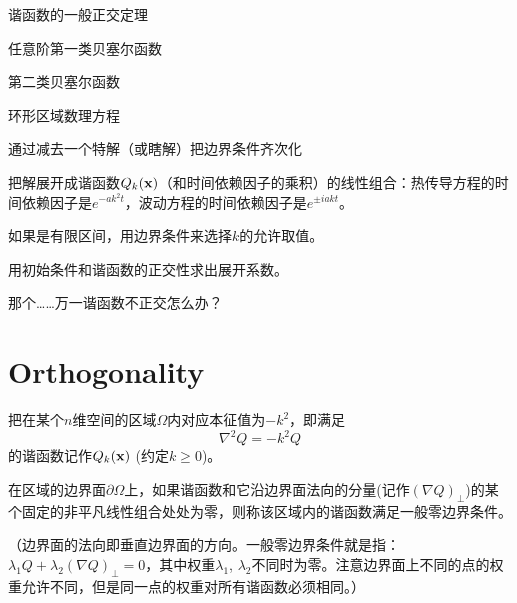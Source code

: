 \documentclass[CJK]{beamer}
\date{}
\begin{document}

\begin{frame}
\bch
\bitem
\item{谐函数的一般正交定理}
\item{任意阶第一类贝塞尔函数}
\item{第二类贝塞尔函数}
\item{环形区域数理方程}
\eitem
\ech
\end{frame}

\begin{frame}
  \bch
  \ech
\end{frame}

\begin{frame}
\bch
{}

\bitem
\item{通过减去一个特解（或瞎解）把边界条件齐次化}
\item{把解展开成谐函数$Q_k({\mathbf{x}})$（和时间依赖因子的乘积）的线性组合：热传导方程的时间依赖因子是$e^{-ak^2t}$，波动方程的时间依赖因子是$e^{\pm iakt}$。}
\item{如果是有限区间，用边界条件来选择$k$的允许取值。}
\item{用初始条件和谐函数的正交性求出展开系数。}
\eitem
\ech
\end{frame}



\begin{frame}
\bch

\bcenter
    {\large 那个……万一谐函数不正交怎么办？}

    \skiplines
    

\ecenter

\ech
\end{frame}


\section{Orthogonality}

\begin{frame}
\bch
把在某个$n$维空间的区域$\Omega$内对应本征值为$-k^2$，即满足
$$ \nabla^2 Q = - k^2 Q $$
的谐函数记作$Q_k({\mathbf{x}})$ (约定$k\ge 0$)。

\skipline

在区域的边界面$\partial \Omega$上，如果{谐函数和它沿边界面法向的分量(记作$(\nabla Q)_{\perp}$)的某个固定的非平凡线性组合处处为零}，则称该区域内的谐函数满足{\blue 一般零边界条件}。

\skiplines

{\small （边界面的法向即垂直边界面的方向。一般零边界条件就是指：$\lambda_1 Q + \lambda_2 (\nabla Q)_{\perp} = 0$，其中权重$\lambda_1$, $\lambda_2$不同时为零。注意边界面上不同的点的权重允许不同，但是同一点的权重对所有谐函数必须相同。）}


\ech
\end{frame}
\end{document}
